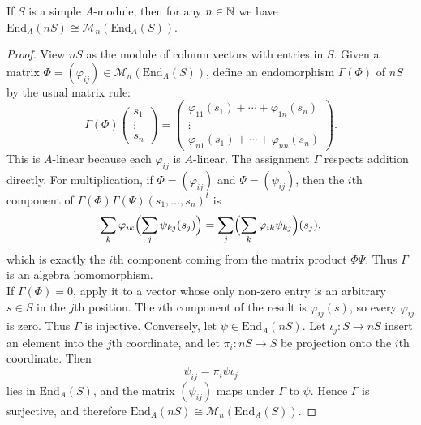 \documentclass[../Odyssey_Project.tex]{subfiles}
\begin{document}
\begin{lemma}
\label{lem:13.13}
If $S$ is a simple $A$-module, then for any $n \in \mathbb{N}$ we have $\mathrm{End}_A(nS) \cong \mathcal{M}_n(\mathrm{End}_A(S))$.
\end{lemma}
\begin{proof}
    View $nS$ as the module of column vectors with entries in $S$. Given a matrix $\Phi = (\varphi_{ij}) \in \mathcal{M}_n(\mathrm{End}_A(S))$, define an endomorphism $\Gamma(\Phi)$ of $nS$ by the usual matrix rule:
    \[
        \Gamma(\Phi)
        \begin{pmatrix}
            s_1\\
            \vdots\\
            s_n
        \end{pmatrix}
        =
        \begin{pmatrix}
            \varphi_{11}(s_1)+\cdots+\varphi_{1n}(s_n)\\
            \vdots\\
            \varphi_{n1}(s_1)+\cdots+\varphi_{nn}(s_n)
        \end{pmatrix}.
    \]
    This is $A$-linear because each $\varphi_{ij}$ is $A$-linear. The assignment $\Gamma$ respects addition directly. For multiplication, if $\Phi=(\varphi_{ij})$ and $\Psi=(\psi_{ij})$, then the $i$th component of $\Gamma(\Phi)\Gamma(\Psi)(s_1,\ldots,s_n)^t$ is
    \[
        \sum_k \varphi_{ik}\Bigl(\sum_j \psi_{kj}(s_j)\Bigr)
        =
        \sum_j\Bigl(\sum_k \varphi_{ik}\psi_{kj}\Bigr)(s_j),
    \]
    which is exactly the $i$th component coming from the matrix product $\Phi\Psi$. Thus $\Gamma$ is an algebra homomorphism.\\
    If $\Gamma(\Phi)=0$, apply it to a vector whose only non-zero entry is an arbitrary $s \in S$ in the $j$th position. The $i$th component of the result is $\varphi_{ij}(s)$, so every $\varphi_{ij}$ is zero. Thus $\Gamma$ is injective. Conversely, let $\psi \in \mathrm{End}_A(nS)$. Let $\iota_j \colon S \to nS$ insert an element into the $j$th coordinate, and let $\pi_i \colon nS \to S$ be projection onto the $i$th coordinate. Then
    \[
        \psi_{ij} = \pi_i \psi \iota_j
    \]
    lies in $\mathrm{End}_A(S)$, and the matrix $(\psi_{ij})$ maps under $\Gamma$ to $\psi$. Hence $\Gamma$ is surjective, and therefore $\mathrm{End}_A(nS) \cong \mathcal{M}_n(\mathrm{End}_A(S))$.
\end{proof}
\end{document}
